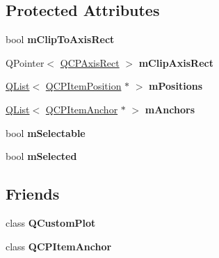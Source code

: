 \subsection*{Protected Attributes}
\begin{DoxyCompactItemize}
\item 
bool {\bfseries m\+Clip\+To\+Axis\+Rect}\hypertarget{class_q_c_p_abstract_item_ad2a70ff6b658fcb84a9427f69d3f587d}{}\label{class_q_c_p_abstract_item_ad2a70ff6b658fcb84a9427f69d3f587d}

\item 
Q\+Pointer$<$ \hyperlink{class_q_c_p_axis_rect}{Q\+C\+P\+Axis\+Rect} $>$ {\bfseries m\+Clip\+Axis\+Rect}\hypertarget{class_q_c_p_abstract_item_a2e1ce3bb8bfe90d4ed98eb9981e72212}{}\label{class_q_c_p_abstract_item_a2e1ce3bb8bfe90d4ed98eb9981e72212}

\item 
\hyperlink{class_q_list}{Q\+List}$<$ \hyperlink{class_q_c_p_item_position}{Q\+C\+P\+Item\+Position} $\ast$ $>$ {\bfseries m\+Positions}\hypertarget{class_q_c_p_abstract_item_a3d628e29ed9af64d49733d6520330adc}{}\label{class_q_c_p_abstract_item_a3d628e29ed9af64d49733d6520330adc}

\item 
\hyperlink{class_q_list}{Q\+List}$<$ \hyperlink{class_q_c_p_item_anchor}{Q\+C\+P\+Item\+Anchor} $\ast$ $>$ {\bfseries m\+Anchors}\hypertarget{class_q_c_p_abstract_item_a2790b98b4890492055ad4a1688287536}{}\label{class_q_c_p_abstract_item_a2790b98b4890492055ad4a1688287536}

\item 
bool {\bfseries m\+Selectable}\hypertarget{class_q_c_p_abstract_item_ad81eb35c8726a0f458db9df9732e0e41}{}\label{class_q_c_p_abstract_item_ad81eb35c8726a0f458db9df9732e0e41}

\item 
bool {\bfseries m\+Selected}\hypertarget{class_q_c_p_abstract_item_a4bdb3457dad1d268c0f78a44152b9645}{}\label{class_q_c_p_abstract_item_a4bdb3457dad1d268c0f78a44152b9645}

\end{DoxyCompactItemize}
\subsection*{Friends}
\begin{DoxyCompactItemize}
\item 
class {\bfseries Q\+Custom\+Plot}\hypertarget{class_q_c_p_abstract_item_a00f8b42d059625f815808a7cc99c2f04}{}\label{class_q_c_p_abstract_item_a00f8b42d059625f815808a7cc99c2f04}

\item 
class {\bfseries Q\+C\+P\+Item\+Anchor}\hypertarget{class_q_c_p_abstract_item_a3d9baa9eac2ae5c3cc42262550aba401}{}\label{class_q_c_p_abstract_item_a3d9baa9eac2ae5c3cc42262550aba401}

\end{DoxyCompactItemize}


